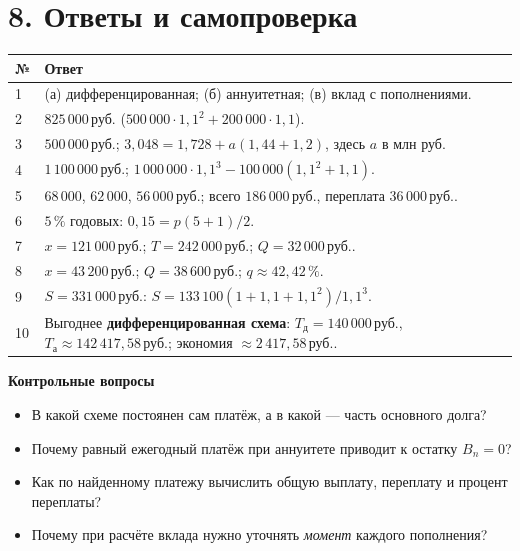 \documentclass[a4paper,12pt]{article}
\newcommand{\rub}{\,\text{руб.}}
\newcommand{\pct}{\,\%}
\begin{document}
\section*{8. Ответы и самопроверка}
\small
\renewcommand{\arraystretch}{1.38}
\begin{longtable}{@{}p{11mm}p{147mm}@{}}
\toprule
\textbf{№} & \textbf{Ответ}\\
\midrule
\endhead
1 & (а) дифференцированная; (б) аннуитетная; (в) вклад с пополнениями.\\
2 & $825\,000\rub$ ($500\,000\cdot1{,}1^2+200\,000\cdot1{,}1$).\\
3 & $500\,000\rub$; $3{,}048=1{,}728+a(1{,}44+1{,}2)$, здесь $a$ в млн руб.\\
4 & $1\,100\,000\rub$; $1\,000\,000\cdot1{,}1^3-100\,000(1{,}1^2+1{,}1)$.\\
5 & $68\,000$, $62\,000$, $56\,000\rub$; всего $186\,000\rub$, переплата $36\,000\rub$.\\
6 & $5\pct$ годовых: $0{,}15=p(5+1)/2$.\\
7 & $x=121\,000\rub$; $T=242\,000\rub$; $Q=32\,000\rub$.\\
8 & $x=43\,200\rub$; $Q=38\,600\rub$; $q\approx42{,}42\pct$.\\
9 & $S=331\,000\rub$: $S=133\,100(1+1{,}1+1{,}1^2)/1{,}1^3$.\\
10 & Выгоднее \textbf{дифференцированная схема}: $T_{\text{д}}=140\,000\rub$, $T_{\text{а}}\approx142\,417{,}58\rub$; экономия $\approx2\,417{,}58\rub$.\\
\bottomrule
\end{longtable}
\normalsize
\vspace{3mm}
\textbf{Контрольные вопросы}
\begin{itemize}
\item В какой схеме постоянен сам платёж, а в какой --- часть основного долга?
\item Почему равный ежегодный платёж при аннуитете приводит к остатку $B_n=0$?
\item Как по найденному платежу вычислить общую выплату, переплату и процент переплаты?
\item Почему при расчёте вклада нужно уточнять \emph{момент} каждого пополнения?
\end{itemize}
\end{document}
